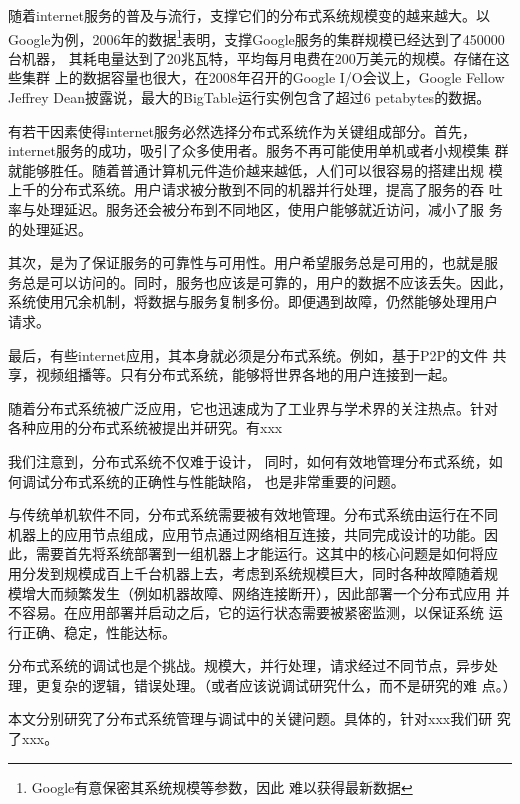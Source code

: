 随着internet服务的普及与流行，支撑它们的分布式系统规模变的越来越大。以
Google为例，2006年的数据\footnote{Google有意保密其系统规模等参数，因此
难以获得最新数据}表明，支撑Google服务的集群规模已经达到了450000台机器，
其耗电量达到了20兆瓦特，平均每月电费在200万美元的规模。存储在这些集群
上的数据容量也很大，在2008年召开的Google I/O会议上，Google Fellow
Jeffrey Dean披露说，最大的BigTable运行实例包含了超过6 petabytes的数据。


有若干因素使得internet服务必然选择分布式系统作为关键组成部分。首先，
internet服务的成功，吸引了众多使用者。服务不再可能使用单机或者小规模集
群就能够胜任。随着普通计算机元件造价越来越低，人们可以很容易的搭建出规
模上千的分布式系统。用户请求被分散到不同的机器并行处理，提高了服务的吞
吐率与处理延迟。服务还会被分布到不同地区，使用户能够就近访问，减小了服
务的处理延迟。

其次，是为了保证服务的可靠性与可用性。用户希望服务总是可用的，也就是服
务总是可以访问的。同时，服务也应该是可靠的，用户的数据不应该丢失。因此，
系统使用冗余机制，将数据与服务复制多份。即便遇到故障，仍然能够处理用户
请求。

最后，有些internet应用，其本身就必须是分布式系统。例如，基于P2P的文件
共享，视频组播等。只有分布式系统，能够将世界各地的用户连接到一起。


随着分布式系统被广泛应用，它也迅速成为了工业界与学术界的关注热点。针对
各种应用的分布式系统被提出并研究。有xxx

我们注意到，分布式系统不仅难于设计，
同时，如何有效地管理分布式系统，如何调试分布式系统的正确性与性能缺陷，
也是非常重要的问题。

与传统单机软件不同，分布式系统需要被有效地管理。分布式系统由运行在不同
机器上的应用节点组成，应用节点通过网络相互连接，共同完成设计的功能。因
此，需要首先将系统部署到一组机器上才能运行。这其中的核心问题是如何将应
用分发到规模成百上千台机器上去，考虑到系统规模巨大，同时各种故障随着规
模增大而频繁发生（例如机器故障、网络连接断开），因此部署一个分布式应用
并不容易。在应用部署并启动之后，它的运行状态需要被紧密监测，以保证系统
运行正确、稳定，性能达标。

分布式系统的调试也是个挑战。规模大，并行处理，请求经过不同节点，异步处
理，更复杂的逻辑，错误处理。（或者应该说调试研究什么，而不是研究的难
点。）

本文分别研究了分布式系统管理与调试中的关键问题。具体的，针对xxx我们研
究了xxx。

